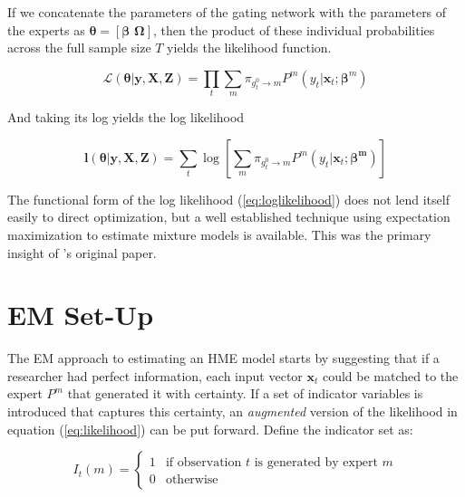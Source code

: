 \documentclass[12pt]{article}
\newcommand{\gateprod}[2]{\pi_{#1 \longrightarrow #2}}
\theoremstyle{definition}
\begin{document}
\bigskip

If we concatenate the parameters of the gating network with the parameters of the experts as $\boldsymbol{\theta} = [\boldsymbol{\beta} \,\, \boldsymbol{\Omega}]$, then the product of these individual probabilities across the full sample size $T$ yields the likelihood function. 

\begin{equation} \label{eq:likelihood}
  \mathcal{L}(\boldsymbol{\theta}| \boldsymbol{y}, \boldsymbol{X}, \boldsymbol{Z}) = \prod_{t}  \sum_{m} \gateprod{g^{0}_{t}}{m}  P^{m}(y_{t}| \boldsymbol{x}_{t}; \boldsymbol{\beta}^{m})
\end{equation}

And taking its log yields the log likelihood

\begin{equation} \label{eq:loglikelihood}
  \boldsymbol{l}(\boldsymbol{\theta}| \boldsymbol{y}, \boldsymbol{X}, \boldsymbol{Z}) = \sum_{t} \log \left[ \sum_{m} \gateprod{g^{0}_{t}}{m} P^{m}(y_{t}| \boldsymbol{x}_{t}; \boldsymbol{\beta^{m}}) \right]
\end{equation}

The functional form of the log likelihood (\ref{eq:loglikelihood}) does not lend itself easily to direct optimization, but a well established technique using expectation maximization \citep{EM_DLR1977} to estimate mixture models is available. This was the primary insight of \citet{JordanJacobs1993}'s original paper.


\section{EM Set-Up} \label{sec:Estimation}

The EM approach to estimating an HME model starts by suggesting that if a researcher had perfect information, each input vector $\boldsymbol{x}_{t}$ could be matched to the expert $P^{m}$ that generated it with certainty. If a set of indicator variables is introduced that captures this certainty, an \textit{augmented} version of the likelihood in equation (\ref{eq:likelihood}) can be put forward. Define the indicator set as:

\begin{equation} \label{eq:indicator}
  I_{t}(m) = \begin{cases} 
     1 & \textrm{if observation $t$ is generated by expert $m$} \\
     0 & \textrm{otherwise}
             \end{cases}
\end{equation}
\end{document}
